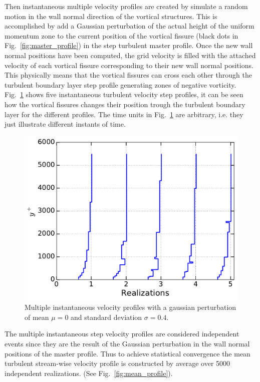 \documentclass[aps,reprint,amsmath,amssymb,pra]{revtex4-1}%
\begin{document}
Then instantaneous multiple velocity profiles are created by simulate a random motion in the wall normal direction  of the vortical structures. This is accomplished by add a Gaussian perturbation of the actual height of the uniform momentum zone to the current position of the vortical fissure (black dots in Fig.~\ref{fig:master_profile}) in the step turbulent master profile. Once the new wall normal positions have been computed, the grid velocity is filled with the attached velocity of each vortical fissure corresponding to their new wall normal positions. This physically means that the vortical fissures can cross each other through the turbulent boundary layer step profile generating zones of negative vorticity. Fig.~\ref{fig:mul_profiles} shows five instantaneous turbulent velocity step profiles, it can be seen how the vortical fissures changes their position trough the turbulent boundary layer for the different profiles. The time units in Fig.~\ref{fig:mul_profiles} are arbitrary, i.e. they just illustrate different instants of time. 
\begin{figure}[b]
\includegraphics[scale=0.46]{figures/multiple_instantaneous_vprof}
\caption{\label{fig:mul_profiles} Multiple instantaneous velocity profiles with a gaussian perturbation of mean $\mu=0$ and standard deviation $\sigma=0.4$.}
\end{figure}
The multiple instantaneous step velocity profiles are considered independent events since they are the result of the Gaussian perturbation in the wall normal positions of the master profile. Thus to achieve statistical convergence the mean turbulent stream-wise velocity profile is constructed by average over 5000 independent realizations. (See Fig.~\ref{fig:mean_profile}).
\end{document}
